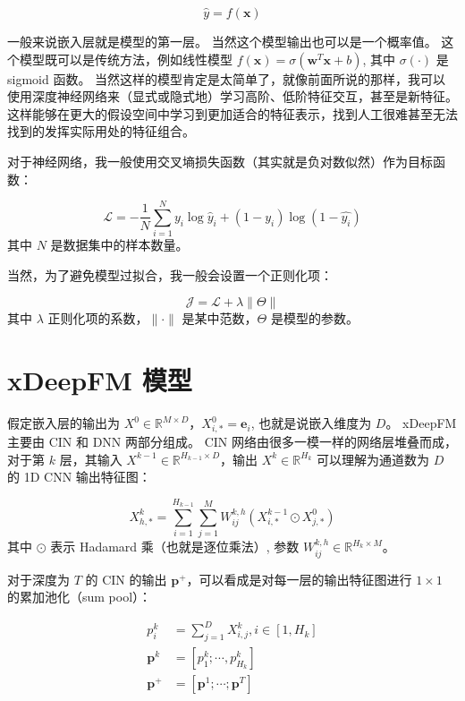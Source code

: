 \documentclass[degree=master,cjk-font=noto]{thuthesis}
\begin{document}
\begin{equation}
  \hat{y} = f(\symbf{x})
\end{equation}

一般来说嵌入层就是模型的第一层。
当然这个模型输出也可以是一个概率值。
这个模型既可以是传统方法，例如线性模型 $f(\symbf{x}) = \sigma(\symbf{w}^T \symbf{x} + b)$, 其中 $\sigma(\cdot)$ 是 sigmoid 函数。
当然这样的模型肯定是太简单了，就像前面所说的那样，我可以使用深度神经网络来（显式或隐式地）学习高阶、低阶特征交互，甚至是新特征。
这样能够在更大的假设空间中学习到更加适合的特征表示，找到人工很难甚至无法找到的发挥实际用处的特征组合。

对于神经网络，我一般使用交叉墒损失函数（其实就是负对数似然）作为目标函数：

\begin{equation} \label{eq:loss}
  \mathcal{L} = - \frac{1}{N} \sum_{i=1}^N y_i \log \hat{y}_i + (1 - y_i) \log (1 - \hat{y_i})
\end{equation}
其中 $N$ 是数据集中的样本数量。

当然，为了避免模型过拟合，我一般会设置一个正则化项：

\begin{equation}
  \mathcal{J} = \mathcal{L} + \lambda \lVert \Theta \rVert
\end{equation}
其中 $\lambda$ 正则化项的系数，$\lVert \cdot \rVert$ 是某中范数，$\Theta$ 是模型的参数。

\section{xDeepFM 模型}

假定嵌入层的输出为 $X^0 \in \mathbb{R}^{M \times D}$，$X^0_{i,*} = \bm{e}_i$, 也就是说嵌入维度为 $D$。
xDeepFM 主要由 CIN 和 DNN 两部分组成。
CIN 网络由很多一模一样的网络层堆叠而成，对于第 $k$ 层，其输入 $X^{k-1} \in \mathbb{R}^{H_{k-1} \times D}$，输出 $X^k \in \mathbb{R}^{H_k}$ 可以理解为通道数为 $D$ 的 1D CNN 输出特征图：

\begin{equation}
  X^k_{h,*} = \sum_{i=1}^{H_{k-1}} \sum_{j=1}^{M} W_{ij}^{k,h}(X_{i,*}^{k-1} \odot X_{j,*}^0)
\end{equation}
其中 $\odot$ 表示 Hadamard 乘（也就是逐位乘法）, 参数 $W_{ij}^{k,h} \in \mathbb{R}^{H_k \times M}$。

对于深度为 $T$ 的 CIN 的输出 $\bm{p}^+$，可以看成是对每一层的输出特征图进行 $1\times 1$ 的累加池化（sum pool）：

\begin{align}
  p_i^k &= \sum_{j=1}^D X_{i,j}^k, i \in [1, H_k] \\
  \bm{p}^k &= [p_1^k; \cdots, p_{H_k}^k] \\
  \bm{p}^+ &= [\bm{p}^1; \cdots; \bm{p}^T]
\end{align}
\end{document}
